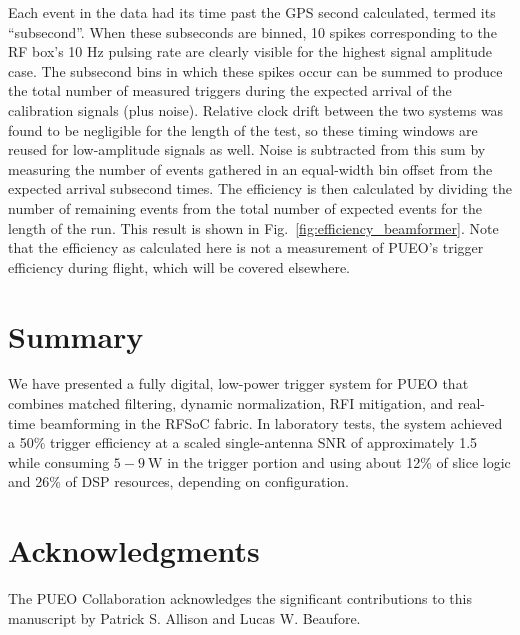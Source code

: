 \documentclass{IEEEtran}
\begin{document}
Each event in the data had its time past the GPS second calculated, termed its ``subsecond''. When these subseconds are binned, 10 spikes corresponding to the RF box's 10 Hz pulsing rate are clearly visible for the highest signal amplitude case. The subsecond bins in which these spikes occur can be summed to produce the total number of measured triggers during the expected arrival of the calibration signals (plus noise). Relative clock drift between the two systems was found to be negligible for the length of the test, so these timing windows are reused for low-amplitude signals as well. Noise is subtracted from this sum by measuring the number of events gathered in an equal-width bin offset from the expected arrival subsecond times. The efficiency is then calculated by dividing the number of remaining events from the total number of expected events for the length of the run. This result is shown in Fig.~\ref{fig:efficiency_beamformer}. Note that the efficiency as calculated here is not a measurement of PUEO's trigger efficiency during flight, which will be covered elsewhere.

\section{Summary}

We have presented a fully digital, low-power trigger system for PUEO that combines
matched filtering, dynamic normalization, RFI mitigation, and real-time beamforming
in the RFSoC fabric. In laboratory tests, the system achieved a 50\% trigger efficiency
at a scaled single-antenna SNR of approximately 1.5 while consuming $5-9~\textrm{W}$ in
the trigger portion and using about 12\% of slice logic and 26\% of DSP resources,
depending on configuration.

\section{Acknowledgments}

The PUEO Collaboration acknowledges the significant
contributions to this manuscript by Patrick S. Allison
and Lucas W. Beaufore.






\end{document}
